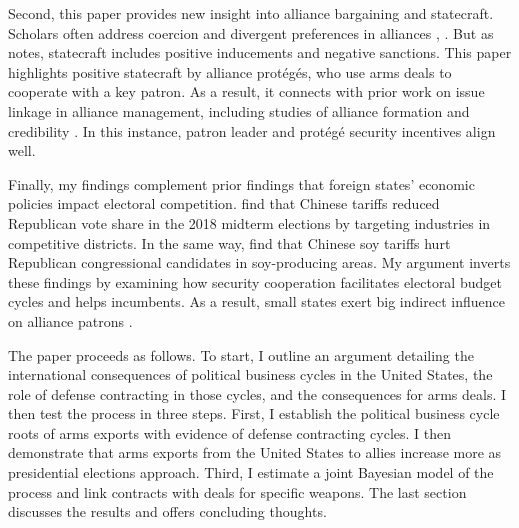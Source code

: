 \documentclass[12pt]{article}
\begin{document}
Second, this paper provides new insight into alliance bargaining and statecraft. 
Scholars often address coercion and divergent preferences in alliances \citep[pg. 122]{Oatley2015}, \citep{Beckeretal2023}. 
But as \citet{Baldwin2020} notes, statecraft includes positive inducements and negative sanctions. 
This paper highlights positive statecraft by alliance prot{\'e}g{\'e}s, who use arms deals to cooperate with a key patron.
As a result, it connects with prior work on issue linkage in alliance management, including studies of alliance formation \citep{Poast2012} and credibility \citep{Davis2008, Poast2013}.
In this instance, patron leader and prot{\'e}g{\'e} security incentives align well.


Finally, my findings complement prior findings that foreign states' economic policies impact electoral competition. 
\citet{KimMargalit2021} find that Chinese tariffs reduced Republican vote share in the 2018 midterm elections by targeting industries in competitive districts.
In the same way, \citet{ChyzhUrbatsch2021} find that Chinese soy tariffs hurt Republican congressional candidates in soy-producing areas. 
My argument inverts these findings by examining how security cooperation facilitates electoral budget cycles and helps incumbents. 
As a result, small states exert big indirect influence on alliance patrons \citep{Keohane1971}.




The paper proceeds as follows. 
To start, I outline an argument detailing the international consequences of political business cycles in the United States, the role of defense contracting in those cycles, and the consequences for arms deals. 
I then test the process in three steps. 
First, I establish the political business cycle roots of arms exports with evidence of defense contracting cycles. 
I then demonstrate that arms exports from the United States to allies increase more as presidential elections approach.
Third, I estimate a joint Bayesian model of the process and link contracts with deals for specific weapons.
The last section discusses the results and offers concluding thoughts.
\end{document}

